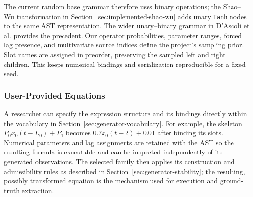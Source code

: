 The current random base grammar therefore uses binary operations; the
Shao--Wu transformation in Section~\ref{sec:implemented-shao-wu}
adds unary \texttt{Tanh} nodes to the same AST
representation. The wider unary--binary grammar in D'Ascoli et al.
provides the precedent. Our operator probabilities, parameter ranges, forced
lag presence, and multivariate source indices define the project's sampling
prior. Slot names are assigned in preorder, preserving the sampled left and
right children. This keeps numerical bindings and serialization reproducible
for a fixed seed.

\subsubsection{User-Provided Equations}
A researcher can specify the expression structure and its bindings directly
within the vocabulary in Section~\ref{sec:generator-vocabulary}. For example,
the skeleton $P_0x_0(t-L_0)+P_1$ becomes
$0.7x_0(t-2)+0.01$ after binding its slots. Numerical parameters and lag
assignments are retained with the AST so the resulting formula is executable
and can be inspected independently of its generated observations.
The selected family then applies its construction and admissibility rules
as described in Section~\ref{sec:generator-stability}; the resulting,
possibly transformed equation is the mechanism used for execution and
ground-truth extraction.
